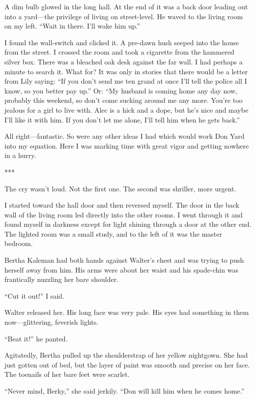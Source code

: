 {A dim bulb glowed in the long hall. At the end of it was a back door leading out into a yard—the privilege of living on street-level. He waved to the living room on my left. “Wait in there. I’ll wake him up.”

I found the wall-switch and clicked it. A pre-dawn hush seeped into the house from the street. I crossed the room and took a cigarette from the hammered silver box. There was a bleached oak desk against the far wall. I had perhaps a minute to search it. What for? It was only in stories that there would be a letter from Lily saying: “If you don’t send me ten grand at once I’ll tell the police all I know, so you better pay up.” Or: “My husband is coming home any day now, probably this weekend, so don’t come sucking around me any more. You’re too jealous for a girl to live with. Alec is a hick and a dope, but he’s nice and maybe I’ll like it with him. If you don’t let me alone, I’ll tell him when he gets back.”

All right—fantastic. So were any other ideas I had which would work Don Yard into my equation. Here I was marking time with great vigor and getting nowhere in a hurry.

***

The cry wasn’t loud. Not the first one. The second was shriller, more urgent.

I started toward the hall door and then reversed myself. The door in the back wall of the living room led directly into the other rooms. I went through it and found myself in darkness except for light shining through a door at the other end. The lighted room was a small study, and to the left of it was the master bedroom.

Bertha Kaleman had both hands against Walter’s chest and was trying to push herself away from him. His arms were about her waist and his spade-chin was frantically nuzzling her bare shoulder.

“Cut it out!” I said.

Walter released her. His long face was very pale. His eyes had something in them now—glittering, feverish lights.

“Beat it!” he panted.

Agitatedly, Bertha pulled up the shoulderstrap of her yellow nightgown. She had just gotten out of bed, but the layer of paint was smooth and precise on her face. The toenails of her bare feet were scarlet.

“Never mind, Berky,” she said jerkily. “Don will kill him when he comes home.”

}
